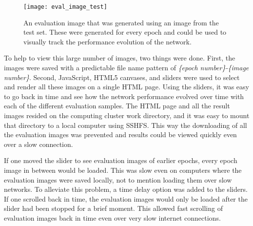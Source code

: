 \begin{figure}
    \centering
    \texttt{[image: eval\_image\_test]}
    \caption[Test sample evaluation image]{An evaluation image that was generated using an image from the test set. These were generated for every epoch and could be used to visually track the performance evolution of the network.}
    \label{fig:eval_image_test_1}
\end{figure}

To help to view this large number of images, two things were done. First, the images were saved with a predictable file name pattern of \textit{\{epoch number\}-\{image number\}}. Second, JavaScript, HTML5 canvases, and sliders were used to select and render all these images on a single \ac{HTML} page. Using the sliders, it was easy to go back in time and see how the network performance evolved over time with each of the different evaluation samples. The \ac{HTML} page and all the result images resided on the computing cluster work directory, and it was easy to mount that directory to a local computer using \ac{SSHFS}. This way the downloading of all the evaluation images was prevented and results could be viewed quickly even over a slow connection.

If one moved the slider to see evaluation images of earlier epochs, every epoch image in between would be loaded. This was slow even on computers where the evaluation images were saved locally, not to mention loading them over slow networks. To alleviate this problem, a time delay option was added to the sliders. If one scrolled back in time, the evaluation images would only be loaded after the slider had been stopped for a brief moment. This allowed fast scrolling of evaluation images back in time even over very slow internet connections.
